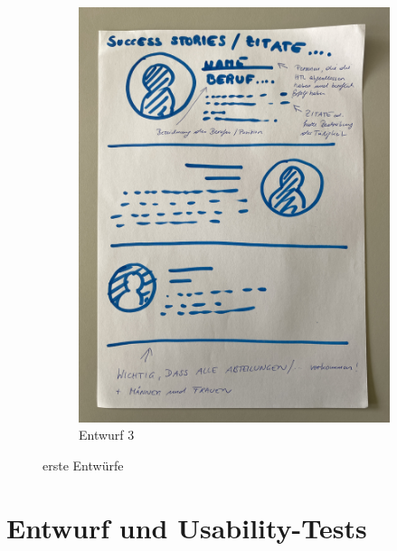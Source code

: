 \begin{figure}
\begin{subfigure}{0.3\textwidth}
     \includegraphics[width=\textwidth, angle=270]{pics/Entwurf_Beispiel_3.JPG}
     \caption{Entwurf 3}
     \label{fig:c}
   \end{subfigure}
   \caption{erste Entwürfe}
   \label{fig:impl:erste_entwuerfe}
 \end{figure}

\section{Entwurf und Usability-Tests}


